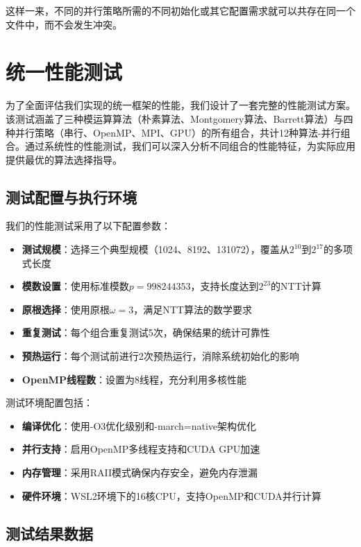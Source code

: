 \documentclass[a4paper]{article}
\begin{document}
这样一来，不同的并行策略所需的不同初始化或其它配置需求就可以共存在同一个文件中，而不会发生冲突。

\section{统一性能测试}

为了全面评估我们实现的统一框架的性能，我们设计了一套完整的性能测试方案。该测试涵盖了三种模运算算法（朴素算法、Montgomery算法、Barrett算法）与四种并行策略（串行、OpenMP、MPI、GPU）的所有组合，共计12种算法-并行组合。通过系统性的性能测试，我们可以深入分析不同组合的性能特征，为实际应用提供最优的算法选择指导。

\subsection{测试配置与执行环境}

我们的性能测试采用了以下配置参数：

\begin{itemize}
\item \textbf{测试规模}：选择三个典型规模（1024、8192、131072），覆盖从$2^{10}$到$2^{17}$的多项式长度
\item \textbf{模数设置}：使用标准模数$p = 998244353$，支持长度达到$2^{23}$的NTT计算
\item \textbf{原根选择}：使用原根$\omega = 3$，满足NTT算法的数学要求
\item \textbf{重复测试}：每个组合重复测试5次，确保结果的统计可靠性
\item \textbf{预热运行}：每个测试前进行2次预热运行，消除系统初始化的影响
\item \textbf{OpenMP线程数}：设置为8线程，充分利用多核性能
\end{itemize}

测试环境配置包括：
\begin{itemize}
\item \textbf{编译优化}：使用-O3优化级别和-march=native架构优化
\item \textbf{并行支持}：启用OpenMP多线程支持和CUDA GPU加速
\item \textbf{内存管理}：采用RAII模式确保内存安全，避免内存泄漏
\item \textbf{硬件环境}：WSL2环境下的16核CPU，支持OpenMP和CUDA并行计算
\end{itemize}

\subsection{测试结果数据}
\end{document}
